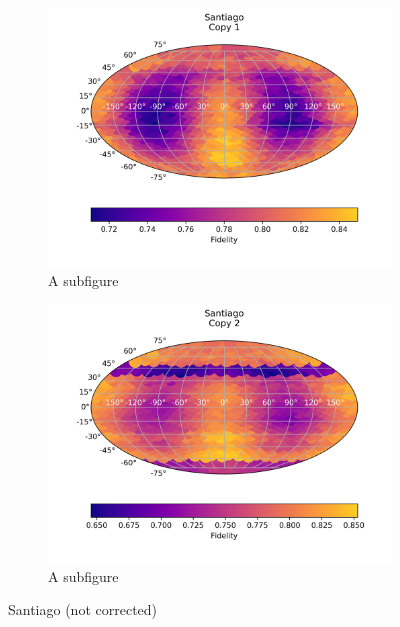 \begin{figure}[H]
    \centering
    \begin{subfigure}{.5\textwidth}
      \centering
      \includegraphics[width=\textwidth]{Figures/PhaseCovariant/IBM/FullSphere/results_santiago.txt_copy1.png}
      \caption{A subfigure}
      \label{fig:pc_santiago_sphere_1}
    \end{subfigure}%
    \begin{subfigure}{.5\textwidth}
      \centering
      \includegraphics[width=\textwidth]{Figures/PhaseCovariant/IBM/FullSphere/results_santiago.txt_copy2.png}
      \caption{A subfigure}
      \label{fig:pc_santiago_sphere_2}
    \end{subfigure}
    \caption{Santiago (not corrected)}
    \label{fig:pc_santiago_sphere}
\end{figure}

